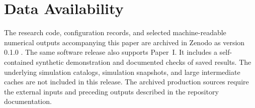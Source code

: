\section*{Data Availability}

The research code, configuration records, and selected machine-readable numerical outputs accompanying this paper are archived in Zenodo as version 0.1.0 \citep{takeuchi2026diffusionbulkflowsoftware}. The same software release also supports Paper~I. It includes a self-contained synthetic demonstration and documented checks of saved results. The underlying simulation catalogs, simulation snapshots, and large intermediate caches are not included in this release. The archived production sources require the external inputs and preceding outputs described in the repository documentation.

